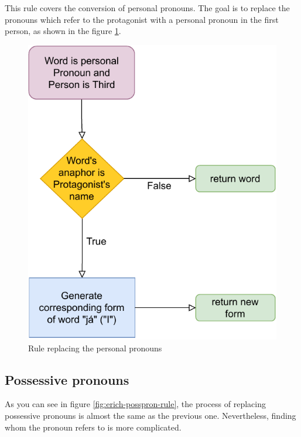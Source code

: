 This rule covers the conversion of personal pronouns. The goal is to replace the pronouns which refer to the protagonist with a personal pronoun in the first person, as shown in the figure \ref{fig:erich-perspron-rule}.

\begin{figure}[!htbp]
\includegraphics[]{data/Erich-Perspron-Rule.pdf}
\caption{Rule replacing the personal pronouns}
\label{fig:erich-perspron-rule}
\end{figure}

\subsection{Possessive pronouns}

As you can see in figure \ref{fig:erich-posspron-rule}, the process of replacing possessive pronouns is almost the same as the previous one. Nevertheless, finding whom the pronoun refers to is more complicated.

